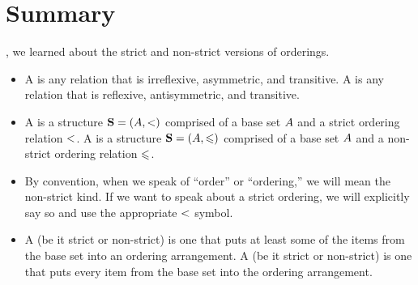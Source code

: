 \documentclass[../../../main.tex]{subfiles}
\begin{document}
\section{Summary}

, we learned about the strict and non-strict versions of orderings.

\begin{itemize}

  \item A  is any relation that is irreflexive, asymmetric, and transitive. A  is any relation that is reflexive, antisymmetric, and transitive.
  
  \item A  is a structure $\struct{S} = (\set{A}, \strictorder/)$ comprised of a base set $A$ and a strict ordering relation $\strictorder/$. A  is a structure $\struct{S} = (\set{A}, \order/)$ comprised of a base set $A$ and a non-strict ordering relation $\order/$.
  
  \item By convention, when we speak of ``order'' or ``ordering,'' we will mean the non-strict kind. If we want to speak about a strict ordering, we will explicitly say so and use the appropriate $\strictorder/$ symbol.
  
  \item A  (be it strict or non-strict) is one that puts at least some of the items from the base set into an ordering arrangement. A  (be it strict or non-strict) is one that puts every item from the base set into the ordering arrangement.

\end{itemize}
\end{document}
